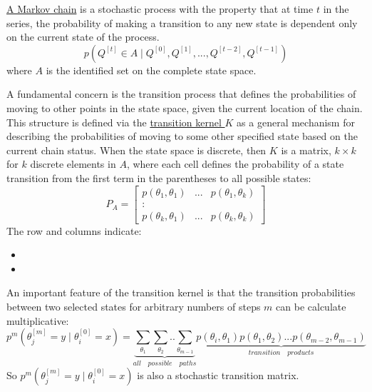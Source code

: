 \documentclass[lecture,12pt,]{pcms-l}
\numberwithin{section}{chapter}
\numberwithin{equation}{chapter}
\theoremstyle{plain}
\theoremstyle{definition}
\theoremstyle{definition}
\begin{document}
\underline{A Markov chain} is a stochastic process with the property that at time $t$ in the series, the probability of making a transition to any new state is dependent only on the current state of the process.
\begin{equation}
p( Q^{[t]} \in A \mid  Q^{[0]}, Q^{[1]},..., Q^{[t-2]}, Q^{[t-1]} )
\end{equation}
where $A$ is the identified set on the complete state space.

A fundamental concern is the transition process that defines the probabilities of moving to other points in the state space, given the current location of the chain. This structure is defined via the \underline{transition kernel $K$} as a general mechanism for describing the probabilities of moving to some other specified state based on the current chain status. When the state space is discrete, then $K$ is a matrix, $k \times k$ for $k$ discrete elements in $A$, where each cell defines the probability of a state transition from the first term in the parentheses to all possible states:
\begin{equation}
P_A=
\begin{bmatrix}
p(\theta_1,\theta_1) & ... & p(\theta_1,\theta_k)\\ 
: &  & \\ 
 p(\theta_k,\theta_1)&...  & p(\theta_k,\theta_k)
\end{bmatrix}
\end{equation} 
The row and columns indicate:
\begin{itemize}
\item
\item 
\end{itemize}
An important feature of the transition kernel is that the transition probabilities between two selected states for arbitrary numbers of steps $m$ can be calculate multiplicative:
\begin{equation}
\label{eq:71}
p^m(\theta^{[m]}_j = y \mid \theta^{[0]}_i = x)=\underbrace{\sum_{\theta_1}\sum_{\theta_2}..\sum_{\theta_{m-1}}}_{all\quad possible \quad paths}\underbrace{p(\theta_i,\theta_1)p(\theta_1,\theta_2)...p(\theta_{m-2},\theta_{m-1})}_{transition\quad products}
\end{equation}
So $p^m(\theta^{[m]}_j = y \mid \theta^{[0]}_i = x)$ is also a stochastic transition matrix.
\end{document}
